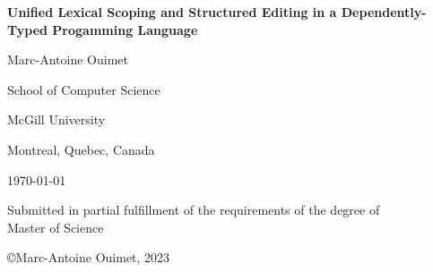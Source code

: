 \begin{titlepage}
\centering

\vspace*{0.5cm}

{\bfseries\LARGE Unified Lexical Scoping and Structured Editing in a Dependently-Typed Progamming Language}

\vspace{1.8cm}

{\large Marc-Antoine Ouimet}

\vspace{2cm}

School of Computer Science

McGill University

Montreal, Quebec, Canada

\vspace{1.5cm}

\monthyeardate\today

\vspace{4cm}

Submitted in partial fulfillment of the requirements of the degree of\\
Master of Science

\vfill

\copyright Marc-Antoine Ouimet, 2023
\end{titlepage}
